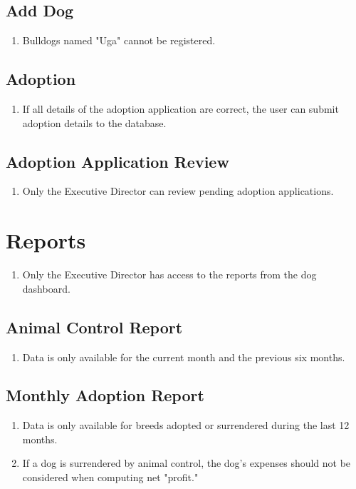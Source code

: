 \documentclass{article}
\begin{document}
\subsection{Add Dog}
\begin{enumerate}
    \item Bulldogs named "Uga" cannot be registered.
\end{enumerate}

\subsection{Adoption}
\begin{enumerate}
    \item If all details of the adoption application are correct, the user can submit adoption details to the database.
\end{enumerate}

\subsection{Adoption Application Review}
\begin{enumerate}
    \item Only the Executive Director can review pending adoption applications.
\end{enumerate}

\section{Reports}
\begin{enumerate}
    \item Only the Executive Director has access to the reports from the dog dashboard.
\end{enumerate}

\subsection{Animal Control Report}
\begin{enumerate}
    \item Data is only available for the current month and the previous six months.
\end{enumerate}

\subsection{Monthly Adoption Report}
\begin{enumerate}
    \item Data is only available for breeds adopted or surrendered during the last 12 months.
    \item If a dog is surrendered by animal control, the dog's expenses should not be considered when computing net "profit."
\end{enumerate}
\end{document}
